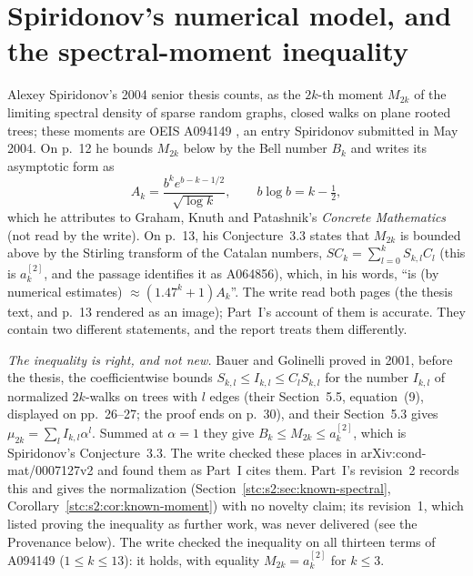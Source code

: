 \documentclass[11pt,letterpaper]{article}
\numberwithin{equation}{section}
\theoremstyle{remark}\newtheorem{remark}[theorem]{Remark}
\begin{document}
\section*{Spiridonov's numerical model, and the spectral-moment inequality}\label{stc:sec:spiridonov}
Alexey Spiridonov's 2004 senior thesis \cite{spiridonov} counts, as the $2k$-th moment $M_{2k}$ of the limiting spectral density of sparse random graphs, closed walks on plane rooted trees; these moments are OEIS A094149 \cite{oeisA094149}, an entry Spiridonov submitted in May 2004. On p.~12 he bounds $M_{2k}$ below by the Bell number $B_k$ and writes its asymptotic form as
\[
 A_k=\frac{b^ke^{b-k-1/2}}{\sqrt{\log k}},\qquad b\log b=k-\tfrac12,
\]
which he attributes to Graham, Knuth and Patashnik's \emph{Concrete Mathematics} (not read by the write). On p.~13, his Conjecture~3.3 states that $M_{2k}$ is bounded above by the Stirling transform of the Catalan numbers, $SC_k=\sum_{l=0}^kS_{k,l}C_l$ (this is $a^{[2]}_k$, and the passage identifies it as A064856), which, in his words, ``is (by numerical estimates) $\approx(1.47^k+1)A_k$''. The write read both pages (the thesis text, and p.~13 rendered as an image); Part~I's account of them is accurate. They contain two different statements, and the report treats them differently.

\emph{The inequality is right, and not new.} Bauer and Golinelli \cite{bauer} proved in 2001, before the thesis, the coefficientwise bounds $S_{k,l}\le I_{k,l}\le C_lS_{k,l}$ for the number $I_{k,l}$ of normalized $2k$-walks on trees with $l$ edges (their Section~5.5, equation~(9), displayed on pp.~26--27; the proof ends on p.~30), and their Section~5.3 gives $\mu_{2k}=\sum_lI_{k,l}\alpha^l$. Summed at $\alpha=1$ they give $B_k\le M_{2k}\le a^{[2]}_k$, which is Spiridonov's Conjecture~3.3. The write checked these places in arXiv:cond-mat/0007127v2 and found them as Part~I cites them. Part~I's revision~2 records this and gives the normalization (Section~\ref{stc:s2:sec:known-spectral}, Corollary~\ref{stc:s2:cor:known-moment}) with no novelty claim; its revision~1, which listed proving the inequality as further work, was never delivered (see the Provenance below). The write checked the inequality on all thirteen terms of A094149 ($1\le k\le13$): it holds, with equality $M_{2k}=a^{[2]}_k$ for $k\le3$.
\end{document}
